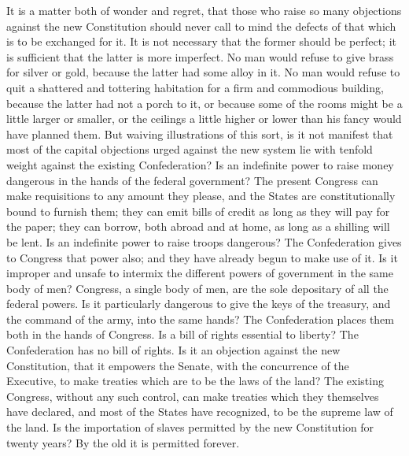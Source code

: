 It is a matter both of wonder and regret, that those who raise so many objections against the new Constitution should never call to mind the defects of that which is to be exchanged for it. It is not necessary that the former should be perfect; it is sufficient that the latter is more imperfect. No man would refuse to give brass for silver or gold, because the latter had some alloy in it. No man would refuse to quit a shattered and tottering habitation for a firm and commodious building, because the latter had not a porch to it, or because some of the rooms might be a little larger or smaller, or the ceilings a little higher or lower than his fancy would have planned them. But waiving illustrations of this sort, is it not manifest that most of the capital objections urged against the new system lie with tenfold weight against the existing Confederation? Is an indefinite power to raise money dangerous in the hands of the federal government? The present Congress can make requisitions to any amount they please, and the States are constitutionally bound to furnish them; they can emit bills of credit as long as they will pay for the paper; they can borrow, both abroad and at home, as long as a shilling will be lent. Is an indefinite power to raise troops dangerous? The Confederation gives to Congress that power also; and they have already begun to make use of it. Is it improper and unsafe to intermix the different powers of government in the same body of men? Congress, a single body of men, are the sole depositary of all the federal powers. Is it particularly dangerous to give the keys of the treasury, and the command of the army, into the same hands? The Confederation places them both in the hands of Congress. Is a bill of rights essential to liberty? The Confederation has no bill of rights. Is it an objection against the new Constitution, that it empowers the Senate, with the concurrence of the Executive, to make treaties which are to be the laws of the land? The existing Congress, without any such control, can make treaties which they themselves have declared, and most of the States have recognized, to be the supreme law of the land. Is the importation of slaves permitted by the new Constitution for twenty years? By the old it is permitted forever.


